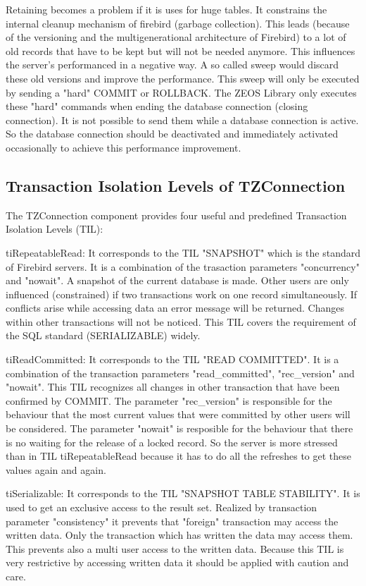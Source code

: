 \documentclass[a4paper,12pt,oneside]{book}
\begin{document}
Retaining becomes a problem if it is uses for huge tables.
It constrains the internal cleanup mechanism of firebird (garbage collection).
This leads (because of the versioning and the multigenerational architecture of Firebird) to a lot of old records that have to be kept but will not be needed anymore.
This influences the server's performanced in a negative way.
A so called sweep would discard these old versions and improve the performance.
This sweep will only be executed by sending a "hard" COMMIT or ROLLBACK.
The ZEOS Library only executes these "hard" commands when ending the database connection (closing connection).
It is not possible to send them while a database connection is active. So the database connection should be deactivated and immediately activated occasionally to achieve this performance improvement.

\subsection{Transaction Isolation Levels of TZConnection}

The TZConnection component provides four useful and predefined Transaction Isolation Levels (TIL):

tiRepeatableRead:
It corresponds to the TIL "SNAPSHOT" which is the standard of Firebird servers.
It is a combination of the trasaction parameters "concurrency" and "nowait".
A snapshot of the current database is made.
Other users are only influenced (constrained) if two transactions work on one record simultaneously.
If conflicts arise while accessing data an error message will be returned.
Changes within other transactions will not be noticed.
This TIL covers the requirement of the SQL standard (SERIALIZABLE) widely.

tiReadCommitted:
It corresponds to the TIL "READ COMMITTED".
It is a combination of the transaction parameters "read\_committed", "rec\_version" and "nowait".
This TIL recognizes all changes in other transaction that have been confirmed by COMMIT.
The parameter "rec\_version" is responsible for the behaviour that the most current values that were committed by other users will be considered.
The parameter "nowait" is resposible for the behaviour that there is no waiting for the release of a locked record.
So the server is more stressed than in TIL tiRepeatableRead because it has to do all the refreshes to get these values again and again.

tiSerializable:
It corresponds to the TIL "SNAPSHOT TABLE STABILITY".
It is used to get an exclusive access to the result set.
Realized by transaction parameter "consistency" it prevents that "foreign" transaction may access the written data.
Only the transaction which has written the data may access them.
This prevents also a multi user access to the written data.
Because this TIL is very restrictive by accessing written data it should be applied with caution and care.
\end{document}
